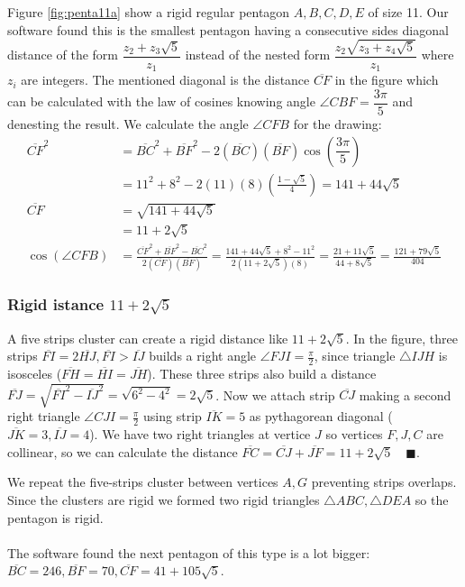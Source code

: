 \documentclass[11pt]{article}
\begin{document}
Figure \ref{fig:penta11a} show a rigid regular pentagon $A,B,C,D,E$ of size 11. Our software found this is the smallest pentagon having a consecutive sides diagonal distance of the form $\dfrac{z_2 + z_3\sqrt5}{z_1}$ instead of the nested form $\dfrac{z_2\sqrt{z_3+z_4\sqrt5}}{z_1}$ where $z_i$ are integers. The mentioned diagonal is the distance $\overline{CF}$ in the figure which can be calculated with the law of cosines knowing angle $\angle{CBF} = \dfrac{3\pi}5$ and denesting the result. We calculate the angle $\angle{CFB}$ for the drawing:
\begin{align}
\overline{CF}^2 &= \overline{BC}^2 + \overline{BF}^2 
 - 2(\overline{BC})(\overline{BF})\cos\left(\dfrac{3\pi}5\right) \nonumber\\
 &= 11^2 + 8^2 - 2(11)(8)\left(\frac{1-\sqrt5}4\right) = 141 + 44\sqrt5 \nonumber\\
\overline{CF} &= \sqrt{141 + 44\sqrt5} \nonumber\\
 &= 11 + 2\sqrt5 \\
%
\cos(\angle{CFB}) &= \frac{\overline{CF}^2 + \overline{BF}^2 - \overline{BC}^2}
 {2(\overline{CF})(\overline{BF})}%
 = \frac{141+44\sqrt5 + 8^2 - 11^2}{2(11+2\sqrt5)(8)}
  = \frac{21+11\sqrt5}{44+8\sqrt5} = \frac{121+79\sqrt5}{404}
\end{align}

\subsubsection{Rigid istance $11+2\sqrt{5}$}

A five strips cluster can create a rigid distance like $11 + 2\sqrt{5}$. In the figure, three strips $\overline{FI} = 2\overline{HJ}, \overline{FI} > \overline{IJ}$ builds a right angle $\angle{FJI} = \frac{\pi}2$, since triangle $\triangle{IJH}$ is isosceles ($\overline{FH} = \overline{HI} = \overline{JH}$). These three strips also build a distance $\overline{FJ} = \sqrt{\overline{FI}^2 - \overline{IJ}^2} = \sqrt{6^2 - 4^2} = 2\sqrt5$. Now we attach strip $\overline{CJ}$ making a second right triangle $\angle{CJI} = \frac{\pi}2$ using strip $\overline{IK}=5$ as pythagorean diagonal ($\overline{JK}=3, \overline{IJ}=4$). We have two right triangles at vertice $J$ so vertices $F,J,C$ are collinear, so we can calculate the distance $\overline{FC} = \overline{CJ} + \overline{JF} = 11 + 2\sqrt5 \quad\blacksquare$. 

We repeat the five-strips cluster between vertices $A,G$ preventing strips overlaps. Since the clusters are rigid we formed two rigid triangles $\triangle{ABC}, \triangle{DEA}$ so the pentagon is rigid.
\\\\
The software found the next pentagon of this type is a lot bigger: $\overline{BC}=246, \overline{BF}=70, \overline{CF}=41+105\sqrt5$.
\end{document}
